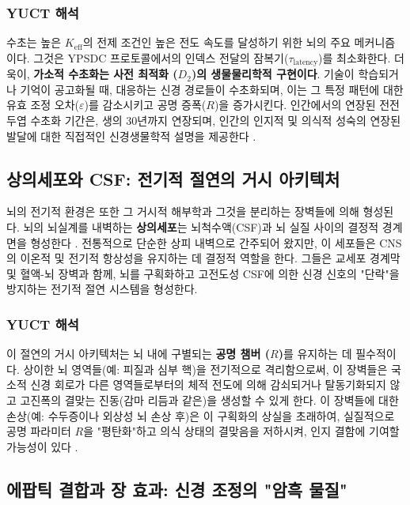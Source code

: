 \documentclass[12pt,a4paper]{article}
\begin{document}
	\subsubsection*{YUCT 해석}
	수초는 높은 \(K_{\mathrm{eff}}\)의 전제 조건인 높은 전도 속도를 달성하기 위한 뇌의 주요 메커니즘이다. 그것은 YPSDC 프로토콜에서의 인덱스 전달의 잠복기(\(\tau_{\text{latency}}\))를 최소화한다. 더욱이, \textbf{가소적 수초화는 사전 최적화 (\(D_2\))의 생물물리학적 구현이다}. 기술이 학습되거나 기억이 공고화될 때, 대응하는 신경 경로들이 수초화되며, 이는 그 특정 패턴에 대한 유효 조정 오차(\(\varepsilon\))를 감소시키고 공명 증폭(\(R\))을 증가시킨다. 인간에서의 연장된 전전두엽 수초화 기간은, 생의 30년까지 연장되며, 인간의 인지적 및 의식적 성숙의 연장된 발달에 대한 직접적인 신경생물학적 설명을 제공한다 \cite{Miller2012, Fields2015}.
	
	\subsection{상의세포와 CSF: 전기적 절연의 거시 아키텍처}
	
	뇌의 전기적 환경은 또한 그 거시적 해부학과 그것을 분리하는 장벽들에 의해 형성된다. 뇌의 뇌실계를 내벽하는 \textbf{상의세포}는 뇌척수액(CSF)과 뇌 실질 사이의 결정적 경계면을 형성한다 \cite{DelBigio2010}. 전통적으로 단순한 상피 내벽으로 간주되어 왔지만, 이 세포들은 CNS의 이온적 및 전기적 항상성을 유지하는 데 결정적 역할을 한다. 그들은 교세포 경계막 및 혈액-뇌 장벽과 함께, 뇌를 구획화하고 고전도성 CSF에 의한 신경 신호의 "단락"을 방지하는 전기적 절연 시스템을 형성한다.
	
	\subsubsection*{YUCT 해석}
	이 절연의 거시 아키텍처는 뇌 내에 구별되는 \textbf{공명 챔버 (\(R\))}를 유지하는 데 필수적이다. 상이한 뇌 영역들(예: 피질과 심부 핵)을 전기적으로 격리함으로써, 이 장벽들은 국소적 신경 회로가 다른 영역들로부터의 체적 전도에 의해 감쇠되거나 탈동기화되지 않고 고진폭의 결맞는 진동(감마 리듬과 같은)을 생성할 수 있게 한다. 이 장벽들에 대한 손상(예: 수두증이나 외상성 뇌 손상 후)은 이 구획화의 상실을 초래하여, 실질적으로 공명 파라미터 \(R\)을 "평탄화"하고 의식 상태의 결맞음을 저하시켜, 인지 결함에 기여할 가능성이 있다 \cite{Krishnamurthy2012}.
	
	\subsection{에팝틱 결합과 장 효과: 신경 조정의 "암흑 물질"}
	
\end{document}
